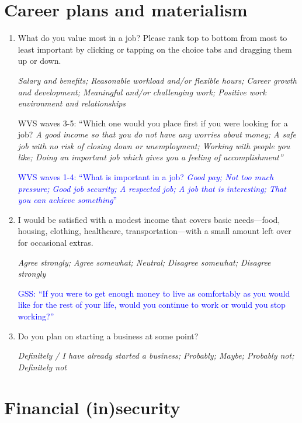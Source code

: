 \documentclass[11pt, headsepline]{article}
\newcommand{\blue}[1]{\textcolor{blue}{#1}}
\newcommand{\green}[1]{\textcolor{sharpgreen}{#1}}
\begin{document}
\section*{Career plans and materialism}

\begin{enumerate}[resume]

    \item What do you value most in a job? Please rank top to bottom from most to least important by clicking or tapping on the choice tabs and dragging them up or down.

    \textit{Salary and benefits; Reasonable workload and/or flexible hours; Career growth and development; Meaningful and/or challenging work; Positive work environment and relationships}

    \green{WVS waves 3-5: ``Which one would you place first if you were looking for a job? \textit{A good income so that you do not have any worries about money; A safe job with no risk of closing down or unemployment; Working with people you like; Doing an important job which gives you a feeling of accomplishment''}}

    \blue{WVS waves 1-4: ``What is important in a job? \textit{Good pay; Not too much pressure; Good job security; A respected job; A job that is interesting; That you can achieve something}''}

    \item I would be satisfied with a modest income that covers basic needs—food, housing, clothing, healthcare, transportation—with a small amount left over for occasional extras.

    \textit{Agree strongly; Agree somewhat; Neutral; Disagree somewhat; Disagree strongly}

    \blue{GSS: ``If you were to get enough money to live as comfortably as you would like for the rest of your life, would you continue to work or would you stop working?''}

    \item Do you plan on starting a business at some point?

    \textit{Definitely / I have already started a business; Probably; Maybe; Probably not; Definitely not}

\end{enumerate}

\section*{Financial (in)security}
\end{document}
